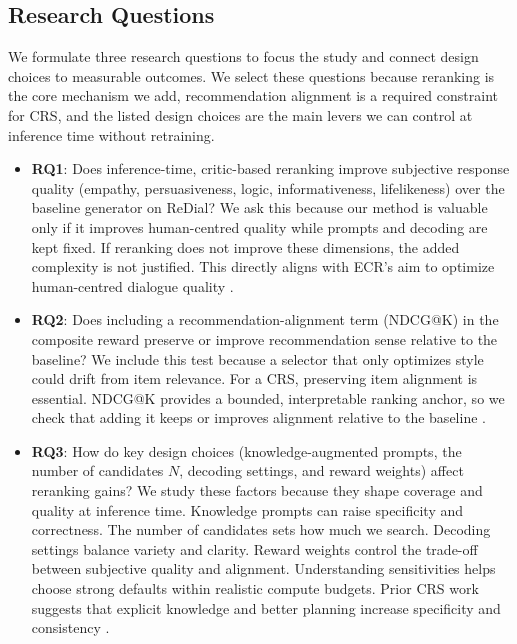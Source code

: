 \documentclass[12pt]{article}
\begin{document}
  \subsection{Research Questions}
  We formulate three research questions to focus the study and connect design choices to measurable outcomes. We select these questions because reranking is the core mechanism we add, recommendation alignment is a required constraint for CRS, and the listed design choices are the main levers we can control at inference time without retraining.
  \begin{itemize}[leftmargin=*]
    \item \textbf{RQ1}: Does inference-time, critic-based reranking improve subjective response quality (empathy, persuasiveness, logic, informativeness, lifelikeness) over the baseline generator on ReDial? 
    \newline
    We ask this because our method is valuable only if it improves human-centred quality while prompts and decoding are kept fixed. If reranking does not improve these dimensions, the added complexity is not justified. This directly aligns with ECR's aim to optimize human-centred dialogue quality \citep{zhang2024ecr}.
    \item \textbf{RQ2}: Does including a recommendation-alignment term (NDCG@K) in the composite reward preserve or improve recommendation sense relative to the baseline? 
    \newline
    We include this test because a selector that only optimizes style could drift from item relevance. For a CRS, preserving item alignment is essential. NDCG@K provides a bounded, interpretable ranking anchor, so we check that adding it keeps or improves alignment relative to the baseline \citep{evidently_ndcg}.
    \item \textbf{RQ3}: How do key design choices (knowledge-augmented prompts, the number of candidates $N$, decoding settings, and reward weights) affect reranking gains? 
    \newline
    We study these factors because they shape coverage and quality at inference time. Knowledge prompts can raise specificity and correctness. The number of candidates sets how much we search. Decoding settings balance variety and clarity. Reward weights control the trade-off between subjective quality and alignment. Understanding sensitivities helps choose strong defaults within realistic compute budgets. Prior CRS work suggests that explicit knowledge and better planning increase specificity and consistency \citep{chen2020kbrd,zhou2020kgsf,speer2017conceptnet,dbpedia_wikipedia,lewis2020rag}.
  \end{itemize}
\end{document}
